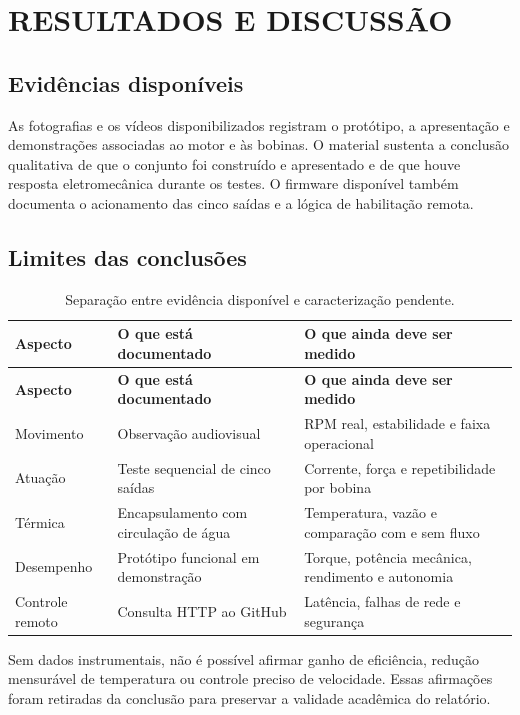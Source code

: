 \documentclass[12pt,a4paper,oneside]{article}
\newcommand{\warningbox}[1]{%
  \begin{center}
  \colorbox{pale}{\parbox{0.92\textwidth}{\color{navy}\small #1}}
  \end{center}
}
\begin{document}
\section{RESULTADOS E DISCUSSÃO}

\subsection{Evidências disponíveis}

As fotografias e os vídeos disponibilizados registram o protótipo, a apresentação e demonstrações associadas ao motor e às bobinas. O material sustenta a conclusão qualitativa de que o conjunto foi construído e apresentado e de que houve resposta eletromecânica durante os testes. O firmware disponível também documenta o acionamento das cinco saídas e a lógica de habilitação remota.

\subsection{Limites das conclusões}

\begin{longtable}{p{2.6cm}p{5.0cm}p{7.0cm}}
\caption{Separação entre evidência disponível e caracterização pendente.}\\
\toprule
\textbf{Aspecto} & \textbf{O que está documentado} & \textbf{O que ainda deve ser medido}\\
\midrule
\endfirsthead
\toprule
\textbf{Aspecto} & \textbf{O que está documentado} & \textbf{O que ainda deve ser medido}\\
\midrule
\endhead
Movimento & Observação audiovisual & RPM real, estabilidade e faixa operacional\\
Atuação & Teste sequencial de cinco saídas & Corrente, força e repetibilidade por bobina\\
Térmica & Encapsulamento com circulação de água & Temperatura, vazão e comparação com e sem fluxo\\
Desempenho & Protótipo funcional em demonstração & Torque, potência mecânica, rendimento e autonomia\\
Controle remoto & Consulta HTTP ao GitHub & Latência, falhas de rede e segurança\\
\bottomrule
\end{longtable}

\warningbox{Sem dados instrumentais, não é possível afirmar ganho de eficiência, redução mensurável de temperatura ou controle preciso de velocidade. Essas afirmações foram retiradas da conclusão para preservar a validade acadêmica do relatório.}
\end{document}

